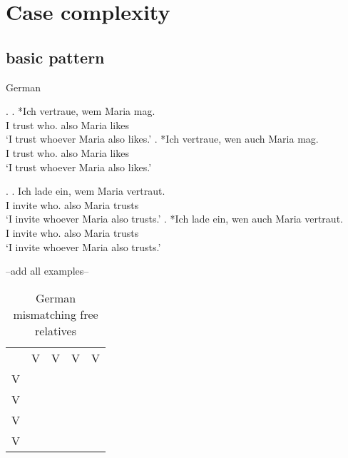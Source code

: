 
\chapter{Case complexity}

\section{basic pattern}


German \citep[344]{vogel2001}

\ex.
\ag. *Ich vertraue, wem Maria mag. \\
I trust who.{} also Maria likes\\
`I trust whoever Maria also likes.'
\bg. *Ich vertraue, wen auch Maria mag. \\
I trust who. also Maria likes\\
`I trust whoever Maria also likes.'

\ex.
\ag. Ich {lade ein}, wem Maria vertraut. \\
I invite who.{} also Maria trusts\\
`I invite whoever Maria also trusts.'
\bg. *Ich {lade ein}, wen auch Maria vertraut. \\
I invite who.{} also Maria trusts\\
`I invite whoever Maria also trusts.'

--add all examples--



\begin{table}[h]
	\center
	\setlength{\tabcolsep}{10pt}
	\caption {German mismatching free relatives}
		\begin{minipage}{\linewidth}
			\begin{tabularx}{\textwidth}{c *{4}{Y}}
				\toprule
						& V 											& V 											& V 											& V 											\\
														\cmidrule(lr){2-5}
					V 		&  			&  	&  	&  	\\
					V 		&  	&	 			&	 	&	 	\\
					V 		& 	&	 	&  			& 	\\
					V 		&  	&  	&  	& 													\\
				\bottomrule
			\end{tabularx}
		\end{minipage}
\end{table}

